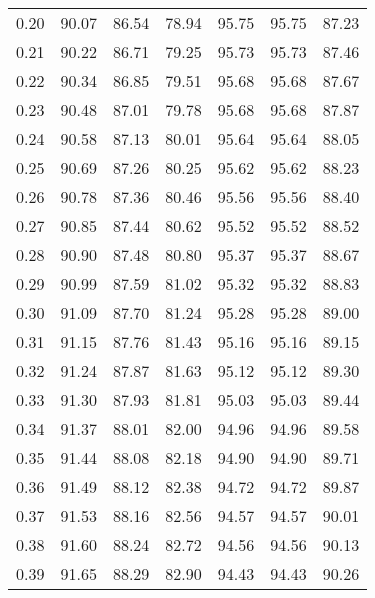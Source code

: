 \begin{tabular}{|c|c|c|c|c|c|c|}
      0.20 &     90.07 &     86.54 &      78.94 &   95.75 &      95.75 &         87.23 \\
      0.21 &     90.22 &     86.71 &      79.25 &   95.73 &      95.73 &         87.46 \\
      0.22 &     90.34 &     86.85 &      79.51 &   95.68 &      95.68 &         87.67 \\
      0.23 &     90.48 &     87.01 &      79.78 &   95.68 &      95.68 &         87.87 \\
      0.24 &     90.58 &     87.13 &      80.01 &   95.64 &      95.64 &         88.05 \\
      0.25 &     90.69 &     87.26 &      80.25 &   95.62 &      95.62 &         88.23 \\
      0.26 &     90.78 &     87.36 &      80.46 &   95.56 &      95.56 &         88.40 \\
      0.27 &     90.85 &     87.44 &      80.62 &   95.52 &      95.52 &         88.52 \\
      0.28 &     90.90 &     87.48 &      80.80 &   95.37 &      95.37 &         88.67 \\
      0.29 &     90.99 &     87.59 &      81.02 &   95.32 &      95.32 &         88.83 \\
      0.30 &     91.09 &     87.70 &      81.24 &   95.28 &      95.28 &         89.00 \\
      0.31 &     91.15 &     87.76 &      81.43 &   95.16 &      95.16 &         89.15 \\
      0.32 &     91.24 &     87.87 &      81.63 &   95.12 &      95.12 &         89.30 \\
      0.33 &     91.30 &     87.93 &      81.81 &   95.03 &      95.03 &         89.44 \\
      0.34 &     91.37 &     88.01 &      82.00 &   94.96 &      94.96 &         89.58 \\
      0.35 &     91.44 &     88.08 &      82.18 &   94.90 &      94.90 &         89.71 \\
      0.36 &     91.49 &     88.12 &      82.38 &   94.72 &      94.72 &         89.87 \\
      0.37 &     91.53 &     88.16 &      82.56 &   94.57 &      94.57 &         90.01 \\
      0.38 &     91.60 &     88.24 &      82.72 &   94.56 &      94.56 &         90.13 \\
      0.39 &     91.65 &     88.29 &      82.90 &   94.43 &      94.43 &         90.26 \\

\end{tabular}
